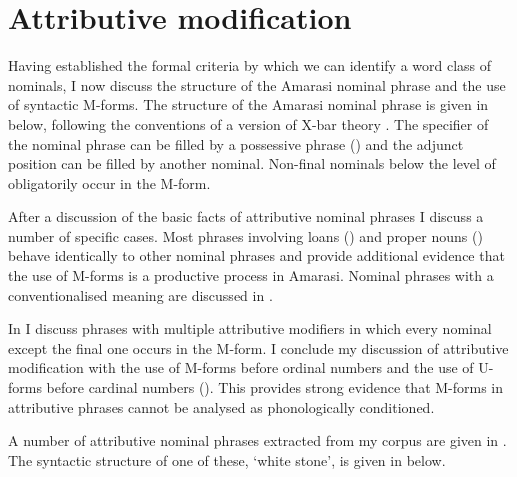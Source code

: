 \section{Attributive modification}\label{sec:AttMod}
Having established the formal criteria by which we can identify a word class of nominals,
I now discuss the structure of the Amarasi nominal phrase and the use of syntactic M-forms.
The structure of the Amarasi nominal phrase is given in  below,
following the conventions of a version of X-bar theory \citep{br16}.
The specifier of the nominal phrase can be filled by a possessive phrase ()
and the adjunct position can be filled by another nominal.
Non-final nominals below the level of  obligatorily occur in the M-form.

\begin{exe}
	\label{tr:NouPhr}
\end{exe}

After a discussion of the basic facts of attributive nominal phrases
I discuss a number of specific cases.
Most phrases involving loans ()
and proper nouns ()
behave identically to other nominal phrases
and provide additional evidence that the use of M-forms
is a productive process in Amarasi.
Nominal phrases with a conventionalised meaning
are discussed in .

In  I discuss phrases with
multiple attributive modifiers in which every
nominal except the final one occurs in the M-form.
I conclude my discussion of attributive modification
with the use of M-forms before ordinal numbers
and the use of U-forms before cardinal numbers ().
This provides strong evidence that M-forms
in attributive phrases cannot be analysed as phonologically conditioned.

A number of attributive nominal phrases extracted from my corpus
are given in .
The syntactic structure of one of these,
 `white stone', is given in  below.

